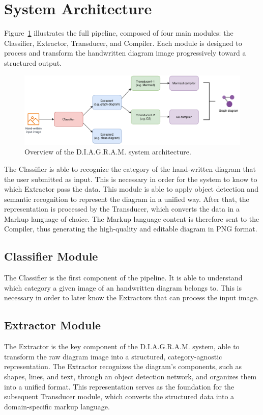 \documentclass[conference]{IEEEtran}
\begin{document}
\section{System Architecture}
Figure~\ref{fig:pipeline} illustrates the full pipeline, composed of four main modules: the Classifier, Extractor, Transducer, and Compiler. Each module is designed to process and transform the handwritten diagram image progressively toward a structured output.

\begin{figure}[H]
\centering
\includegraphics[width=\linewidth]{overview.png}
\caption{Overview of the D.I.A.G.R.A.M. system architecture.}
\label{fig:pipeline}
\end{figure}

The Classifier is able to recognize the category of the hand-written diagram that the user submitted as input. This is necessary in order for the system to know to which Extractor pass the data. This module is able to apply object detection and semantic recognition to represent the diagram in a unified way. After that, the representation is processed by the Transducer, which converts the data in a Markup language of choice. The Markup language content is therefore sent to the Compiler, thus generating the high-quality and editable diagram in PNG format.

\subsection{Classifier Module}
The Classifier is the first component of the pipeline. It is able to understand which category a given image of an handwritten diagram belongs to. This is necessary in order to later know the Extractors that can process the input image.
\subsection{Extractor Module}
The Extractor is the key component of the D.I.A.G.R.A.M. system, able to transform the raw diagram image into a structured, category-agnostic representation.
The Extractor recognizes the diagram's components, such as shapes, lines, and text, through an object detection network, and organizes them into a unified format. This representation serves as the foundation for the subsequent Transducer module, which converts the structured data into a domain-specific markup language.
\end{document}
